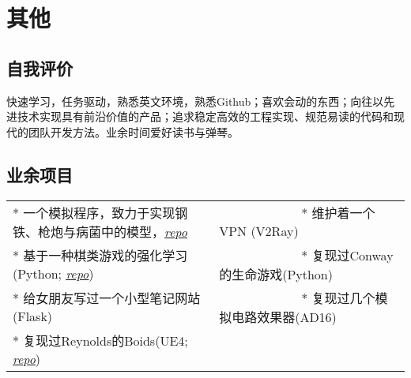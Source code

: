 \documentclass[11pt,a4paper,sans]{moderncv}        %
\begin{document}
\vspace{-6pt}

\section{\yahei 其他}

\subsection{\yahei 自我评价}

{\yahei\small 快速学习，任务驱动，熟悉英文环境，熟悉Github；喜欢会动的东西；向往以先进技术实现具有前沿价值的产品；追求稳定高效的工程实现、规范易读的代码和现代的团队开发方法。业余时间爱好读书与弹琴。}

\subsection{\yahei 业余项目}

\begin{tabular}{ l l }

	\yahei\footnotesize{* 一个模拟程序，致力于实现钢铁、枪炮与病菌中的模型，\href{https://github.com/taotsi/DingRL}{\underline{\emph{repo}}}}
	& \ \ \ \ \ \ \ \ \ \ \ \ \
	\yahei\footnotesize{* 维护着一个VPN (V2Ray)} \\
	\yahei\footnotesize{* 基于一种棋类游戏的强化学习(Python; \href{https://github.com/taotsi/DingRL}{\underline{\emph{repo}}})}
	& \ \ \ \ \ \ \ \ \ \ \ \ \
	\yahei\footnotesize{* 复现过Conway的生命游戏(Python)} \\
	\yahei\footnotesize{* 给女朋友写过一个小型笔记网站(Flask)}
	& \ \ \ \ \ \ \ \ \ \ \ \ \
	\yahei\footnotesize{* 复现过几个模拟电路效果器(AD16)} \\
	\yahei\footnotesize{* 复现过Reynolds的Boids(UE4; \href{https://github.com/taotsi/UE4Swarm}{\underline{\emph{repo}}})}
\end{tabular}
\end{document}
